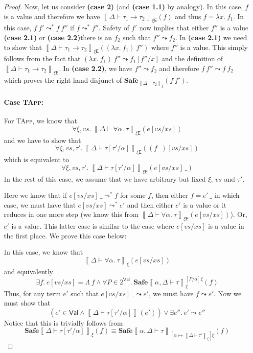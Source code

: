 \documentclass{article}
\newcommand{\EXP}{\mathsf{E}}
\newcommand{\VAL}{\mathsf{Val}}
\newcommand{\semtyp}[3]{\left\llbracket #2 \vdash #3 \right\rrbracket_{#1}}
\newcommand{\semenv}{\xi}
\newcommand{\TArg}{\_}
\newcommand{\TLam}{\Lambda}
\newcommand{\CtxTps}{\Delta}
\newcommand{\expr}{e}
\newcommand{\exprB}{f}
\newcommand{\var}{x}
\newcommand{\typ}{\tau}
\newcommand{\tvar}{\alpha}
\newcommand{\step}{\leadsto}
\newcommand{\steps}{\leadsto^*}
\begin{document}
\begin{proof}
Now, let us consider \textbf{(case 2)} (and \textbf{(case 1.1)} by analogy). In this case, $\exprB$ is
a value and therefore we have $\semtyp{\semenv\EXP}{\CtxTps}{\typ_1 \to \typ_2}(\exprB)$ and thus $\exprB = \lambda \var.~\exprB_1$.
In this case, $\exprB~\exprB' \steps \exprB~\exprB''$ if $\exprB \steps \exprB''$. Safety of $\exprB'$ now implies that
either $\exprB''$ is a value \textbf{(case 2.1)} or \textbf{(case 2.2)}there is an $\exprB_2$ such that
$\exprB'' \step \exprB_2$.
In \textbf{(case 2.1)} we need to show that $\semtyp{\semenv\EXP}{\CtxTps}{\typ_1 \to \typ_2}((\lambda \var.~\exprB_1)~\exprB'')$ where $\exprB''$ is a value. This simply follows from the fact that $(\lambda \var.~\exprB_1)~\exprB'' \step \exprB_1[\exprB''/\var]$ and the definition of $\semtyp{\semenv\EXP}{\CtxTps}{\typ_1 \to \typ_2}$.
In \textbf{(case 2.2)}, we have $\exprB'' \step \exprB_2$ and therefore $\exprB~\exprB'' \step \exprB~\exprB_2$ which
proves the right hand disjunct of $\mathbf{Safe}_{\semtyp{\semenv}{\CtxTps}{\typ_2}}(\exprB~\exprB')$.

\paragraph{Case \textsc{TApp}:}
For \textsc{TApp}, we know that
\[
\forall \semenv, \mathit{vs}.~\semtyp{\semenv\EXP}{\CtxTps}{\forall \tvar.~\typ}(\expr[\mathit{vs}/\mathit{xs}])
\]
and we have to show that
\[
\forall \semenv, \mathit{vs}, \typ'.~\semtyp{\semenv\EXP}{\CtxTps}{\typ[\typ'/\tvar]}((\exprB~\TArg)[\mathit{vs}/\mathit{xs}])
\]
which is equivalent to
\[
\forall \semenv, \mathit{vs}, \typ'.~\semtyp{\semenv\EXP}{\CtxTps}{\typ[\typ'/\tvar]}(\expr[\mathit{vs}/\mathit{xs}]~\TArg)
\]
In the rest of this case, we assume that we have arbitrary
but fixed $\semenv$, $\mathit{vs}$ and $\typ'$.

Here we know that if $\expr[\mathit{vs}/\mathit{xs}]~\TArg \steps \exprB$
for some $f$, then either $\exprB = \expr'~\TArg$ in which case, we must
have that $\expr[\mathit{vs}/\mathit{xs}] \steps \expr'$ and then
either $\expr'$ is a value or it reduces in one more step
(we know this from $\semtyp{\semenv\EXP}{\CtxTps}{\forall \tvar.~\typ}(\expr[\mathit{vs}/\mathit{xs}])$).
Or, $\expr'$ is a value. This latter case is similar to the case where $e[\mathit{vs}/\mathit{xs}]$ is a value in the first place.
We prove this case below:

In this case, we know that
\[
\semtyp{\semenv}{\CtxTps}{\forall \tvar.~\typ}(\expr[\mathit{vs}/\mathit{xs}])
\]
and equivalently
\[
\exists \exprB.~\expr[\mathit{vs}/\mathit{xs}] = \TLam~\exprB \land
\forall P \in 2^{\VAL}.~\mathbf{Safe}{\semtyp{\semenv}{\tvar, \CtxTps}{\typ}
^{[P/\tvar]\semenv}}(f)
\]
Thus, for any term $\expr'$ such that
$\expr[\mathit{vs}/\mathit{xs}]~\TArg \step \expr'$, we must have
$\exprB \step \expr'$.
Now we must show that
\[
(\expr' \in \VAL \land
\semtyp{}{\CtxTps}{\typ[\typ'/\tvar]}(\expr'))
\lor
\exists \expr''.~\expr' \step \expr''
\]
Notice that this is trivially follows from
\[
\mathbf{Safe}{\semtyp{\semenv}{\CtxTps}{\typ[\typ'/\tvar]}
}(f)
\equiv
\mathbf{Safe}{\semtyp{[\tvar \mapsto \semtyp{\semenv}{\CtxTps}{\typ'}]\semenv}{\tvar, \CtxTps}{\typ}}(\exprB)
\]


\end{proof}
\end{document}
